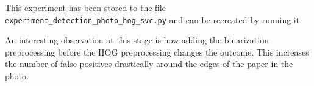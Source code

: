 This experiment has been stored to the file \texttt{experiment\_detection\_photo\_hog\_svc.py} and can be recreated by running it.

An interesting observation at this stage is how adding the binarization preprocessing before the HOG preprocessing changes the outcome.
This increases the number of false positives drastically around the edges of the paper in the photo.

